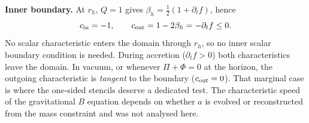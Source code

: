 \documentclass[11pt,a4paper]{article}
\newcommand{\fd}{\partial_t f}
\begin{document}
\textbf{Inner boundary.} At $r_h$, $Q=1$ gives $\beta_h=\tfrac12(1+\fd)$, hence
\[
  c_{\rm in}=-1,\qquad c_{\rm out}=1-2\beta_h=-\fd\le0 .
\]
No scalar characteristic enters the domain through $r_h$, so no inner scalar boundary condition
is needed. During accretion ($\fd>0$) both characteristics leave the domain. In vacuum, or
whenever $\Pi+\Phi=0$ at the horizon, the outgoing characteristic is \emph{tangent} to the
boundary ($c_{\rm out}=0$). That marginal case is where the one-sided stencils deserve a
dedicated test. The characteristic speed of the gravitational $B$ equation depends on whether
$a$ is evolved or reconstructed from the mass constraint and was not analysed here.
\end{document}
